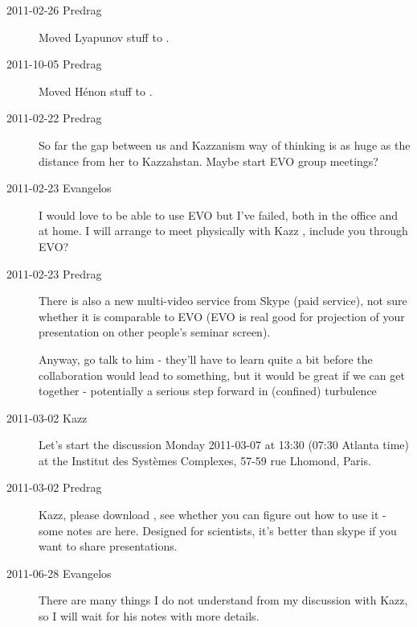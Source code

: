 \begin{description}

\item[2011-02-26 Predrag] Moved Lyapunov stuff to
    .

\item[2011-10-05 Predrag] Moved H\'enon stuff to
    .

\item[2011-02-22 Predrag]
So far the gap between us and Kazzanism way of thinking is as huge
as the distance from her to Kazzahstan.
Maybe start EVO group meetings?

\item[2011-02-23 Evangelos]
I would love to be able to use EVO but I've
    failed, both in the office and at home. I will arrange to meet
    physically with Kazz \etal, include you
    through EVO?

\item[2011-02-23 Predrag]
There is also a new multi-video service from Skype (paid service), not
sure whether it is comparable to EVO (EVO is real good for projection of
your presentation on other people's seminar screen).

Anyway, go talk to him - they'll have to learn quite a bit before the
collaboration would lead to something, but it would be great if we can
get together - potentially a serious step forward in (confined)
turbulence

\item[2011-03-02 Kazz] Let's start the discussion
 Monday 2011-03-07 at 13:30 (07:30 Atlanta time) at the Institut des
 Syst\`emes Complexes, 57-59 rue Lhomond, Paris.

\item[2011-03-02 Predrag] Kazz, please download
, see whether you can
figure out how to use it - some notes are
{here}. Designed for scientists, it's better than skype if you want to
share presentations.

\item[2011-06-28 Evangelos]
There are many things I do not understand from my discussion with Kazz,
so I will wait for his notes with more details.



\end{description}
